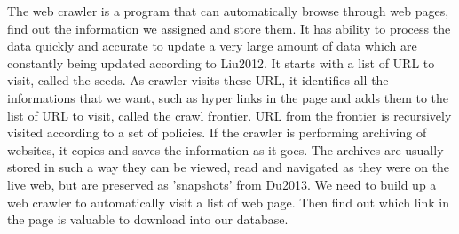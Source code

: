 	
	The web crawler is a program that can automatically browse through web pages, find out the information we assigned and store them.
	It has ability to process the data quickly and accurate to update a very large amount of data which are constantly being updated according to Liu2012\cite{Liu2012}.
	It starts with a list of URL to visit, called the seeds.
	As crawler visits these URL, it identifies all the informations that we want, such as hyper links in the page and adds them to the list of URL to visit, called the crawl frontier.
	URL from the frontier is recursively visited according to a set of policies.
	If the crawler is performing archiving of websites, it copies and saves the information as it goes.
	The archives are usually stored in such a way they can be viewed, read and navigated as they were on the live web, but are preserved as 'snapshots' from Du2013\cite{Du2013}.
	We need to build up a web crawler to automatically visit a list of web page.
	Then find out which link in the page is valuable to download into our database.
	
	

\newpage %
